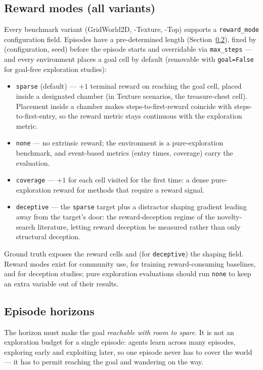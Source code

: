 \documentclass[11pt]{article}
\begin{document}
\subsection{Reward modes (all variants)}
\label{sec:reward}

Every benchmark variant (GridWorld2D, -Texture, -Top) supports a
\texttt{reward\_mode} configuration field. Episodes have a
pre-determined length (Section~\ref{sec:horizon}), fixed by
(configuration, seed) before the episode starts and overridable via
\texttt{max\_steps} --- and every environment places a goal cell by
default (removable with \texttt{goal=False} for goal-free
exploration studies):
\begin{itemize}[leftmargin=2em, itemsep=1pt]
  \item \texttt{sparse} (default) --- $+1$ terminal reward on
        reaching the goal cell, placed inside a designated chamber
        (in Texture scenarios, the treasure-chest cell). Placement
        inside a chamber makes steps-to-first-reward coincide with
        steps-to-first-entry, so the reward metric stays continuous
        with the exploration metric.
  \item \texttt{none} --- no extrinsic reward; the environment is a
        pure-exploration benchmark, and event-based metrics (entry
        times, coverage) carry the evaluation.
  \item \texttt{coverage} --- $+1$ for each cell visited for the
        first time: a dense pure-exploration reward for methods that
        require a reward signal.
  \item \texttt{deceptive} --- the \texttt{sparse} target plus a
        distractor shaping gradient leading away from the target's
        door: the reward-deception regime of the novelty-search
        literature, letting reward deception be measured rather than
        only structural deception.
\end{itemize}
Ground truth exposes the reward cells and (for \texttt{deceptive})
the shaping field. Reward modes exist for community use, for training
reward-consuming baselines, and for deception studies; pure
exploration evaluations should run \texttt{none} to keep an extra
variable out of their results.

\subsection{Episode horizons}
\label{sec:horizon}

The horizon must make the goal \emph{reachable with room to spare}.
It is not an exploration budget for a single episode: agents learn
across many episodes, exploring early and exploiting later, so one
episode never has to cover the world --- it has to permit reaching
the goal and wandering on the way.
\end{document}
